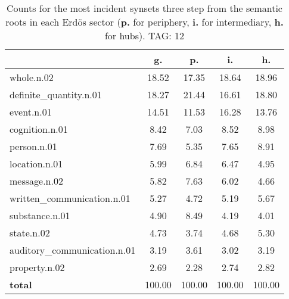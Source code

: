 \begin{table}[h!]
\begin{center}
\begin{tabular}{| l || c | c | c | c |}\hline
 & {\bf g.} & {\bf p.} & {\bf i.} & {\bf h.} \\\hline\hline
whole.n.02 & 18.52  & 17.35  & 18.64  & 18.96 \\\hline
definite\_quantity.n.01 & 18.27  & 21.44  & 16.61  & 18.80 \\\hline
event.n.01 & 14.51  & 11.53  & 16.28  & 13.76 \\\hline
cognition.n.01 & 8.42  & 7.03  & 8.52  & 8.98 \\\hline
person.n.01 & 7.69  & 5.35  & 7.65  & 8.91 \\\hline
location.n.01 & 5.99  & 6.84  & 6.47  & 4.95 \\\hline
message.n.02 & 5.82  & 7.63  & 6.02  & 4.66 \\\hline
written\_communication.n.01 & 5.27  & 4.72  & 5.19  & 5.67 \\\hline
substance.n.01 & 4.90  & 8.49  & 4.19  & 4.01 \\\hline
state.n.02 & 4.73  & 3.74  & 4.68  & 5.30 \\\hline
auditory\_communication.n.01 & 3.19  & 3.61  & 3.02  & 3.19 \\\hline
property.n.02 & 2.69  & 2.28  & 2.74  & 2.82 \\\hline\hline
{{\bf total}} & 100.00  & 100.00  & 100.00  & 100.00 \\\hline
\end{tabular}
\caption{Counts for the most incident synsets three step from the semantic roots in each Erd\"os sector ({\bf p.} for periphery, {\bf i.} for intermediary, {\bf h.} for hubs). TAG: 12}
\end{center}
\end{table}